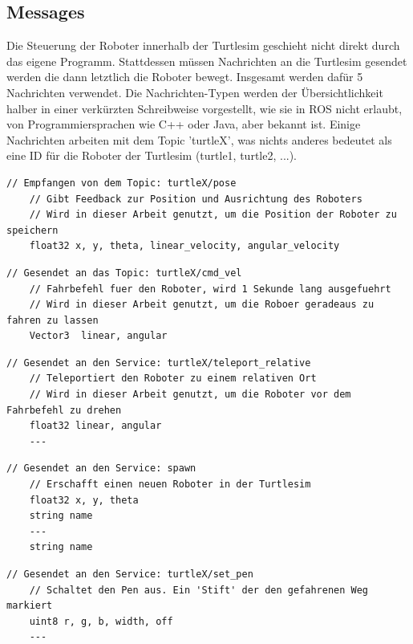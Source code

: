 \subsection*{Messages}

Die Steuerung der Roboter innerhalb der Turtlesim geschieht nicht direkt durch das eigene Programm. Stattdessen müssen Nachrichten an die Turtlesim gesendet werden die dann letztlich die Roboter bewegt. Insgesamt werden dafür 5 Nachrichten verwendet. Die Nachrichten-Typen werden der Übersichtlichkeit halber in einer verkürzten Schreibweise vorgestellt, wie sie in \ac{ROS} nicht erlaubt, von Programmiersprachen wie C++ oder Java, aber bekannt ist. Einige Nachrichten arbeiten mit dem Topic 'turtleX', was nichts anderes bedeutet als eine ID für die Roboter der Turtlesim (turtle1, turtle2, ...).

\begin{lstlisting}[style=ros, title=turtlesim/Pose.msg]
	// Empfangen von dem Topic: turtleX/pose
	// Gibt Feedback zur Position und Ausrichtung des Roboters
	// Wird in dieser Arbeit genutzt, um die Position der Roboter zu speichern
	float32 x, y, theta, linear_velocity, angular_velocity
\end{lstlisting}

\begin{lstlisting}[style=ros, title=geometry\_msgs/Twist.msg]
	// Gesendet an das Topic: turtleX/cmd_vel
	// Fahrbefehl fuer den Roboter, wird 1 Sekunde lang ausgefuehrt
	// Wird in dieser Arbeit genutzt, um die Roboer geradeaus zu fahren zu lassen
	Vector3  linear, angular
\end{lstlisting}

\begin{lstlisting}[style=ros, title=turtlesim/TeleportRelative Service]
	// Gesendet an den Service: turtleX/teleport_relative
	// Teleportiert den Roboter zu einem relativen Ort
	// Wird in dieser Arbeit genutzt, um die Roboter vor dem Fahrbefehl zu drehen
	float32 linear, angular
	---
\end{lstlisting}

\begin{lstlisting}[style=ros, title=turtlesim/Spawn Service]
	// Gesendet an den Service: spawn
	// Erschafft einen neuen Roboter in der Turtlesim
	float32 x, y, theta
	string name
	---
	string name
\end{lstlisting}

\begin{lstlisting}[style=ros, title=turtlesim/SetPen Service]
	// Gesendet an den Service: turtleX/set_pen
	// Schaltet den Pen aus. Ein 'Stift' der den gefahrenen Weg markiert
	uint8 r, g, b, width, off
	---
\end{lstlisting}

